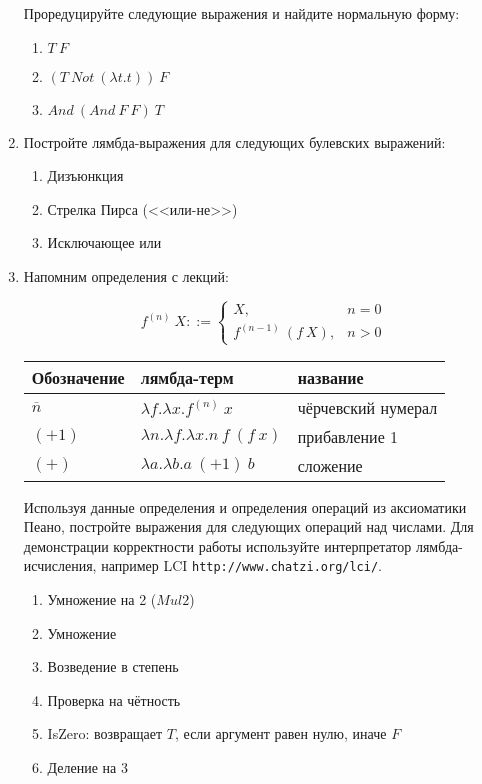 \documentclass[10pt,a4paper,oneside]{article}
\begin{document}
\begin{enumerate}
\begin{enumerate}
\end{enumerate}
Проредуцируйте следующие выражения и найдите нормальную форму:

\begin{enumerate}
\item $T\ F$
\item $(T\ Not\ (\lambda t.t))\ F$
\item $And\ (And\ F\ F)\ T$
\end{enumerate}

\item Постройте лямбда-выражения для следующих булевских выражений:
\begin{enumerate}
\item Дизъюнкция
\item Стрелка Пирса (<<или-не>>)
\item Исключающее или
\end{enumerate}

\item Напомним определения с лекций:

$$f^{(n)}\ X ::= \left\{\begin{array}{ll} X, & n=0\\
                                f^{(n-1)}\ (f\ X), & n>0\end{array}\right.$$

\begin{center}\begin{tabular}{lll}
Обозначение & лямбда-терм & название\\\hline
$\overline{n}$ & $\lambda f.\lambda x.f^{(n)}\ x$ & чёрчевский нумерал\\
$(+1)$ & $\lambda n.\lambda f.\lambda x.n\ f\ (f\ x)$ & прибавление 1\\
$(+)$ & $\lambda a.\lambda b.a\ (+1)\ b$ & сложение\\
\end{tabular}\end{center}

Используя данные определения и определения операций из аксиоматики Пеано, 
постройте выражения для следующих операций над числами. Для демонстрации
корректности работы используйте интерпретатор лямбда-исчисления, например
LCI \texttt{http://www.chatzi.org/lci/}.

\begin{enumerate}
\item Умножение на 2 ($Mul2$)
\item Умножение
\item Возведение в степень
\item Проверка на чётность
\item IsZero: возвращает $T$, если аргумент равен нулю, иначе $F$
\item Деление на 3
\end{enumerate}


\end{enumerate}
\end{document}
